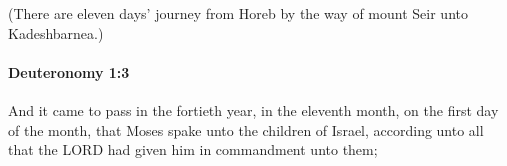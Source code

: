 			(There are eleven days' journey from Horeb by the way of mount Seir unto Kadeshbarnea.)


		\paragraph{Deuteronomy 1:3} %
			\label{DEUTERONOMY-1-3}

			And it came to pass in the fortieth year, in the eleventh month, on the first day of the month, that Moses spake unto the children of Israel, according unto all that the LORD had given him in commandment unto them;


